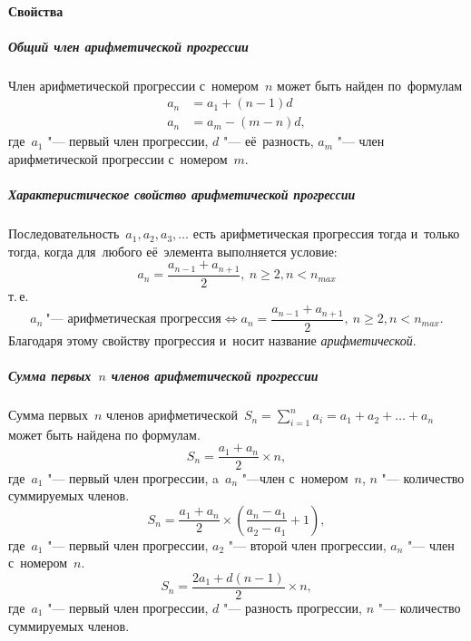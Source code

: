 \documentclass[]{scrartcl}
\begin{document}
{{\paragraph{Свойства}
\subparagraph{Общий член арифметической прогрессии}
Член арифметической прогрессии с~номером~${\textstyle n}$ может быть найден по~формулам
\begin{equation}\label{eq:arithmetic-progression-4}
	\begin{aligned}
	a_n&=a_1+(n-1)d\\
	a_n&=a_{m}-(m-n)d, 
	\end{aligned}
\end{equation}
где~${\textstyle a_{1}}$ "--- первый член прогрессии, ${\textstyle d}$ "--- её~разность, ${\textstyle a_{m}}$ "--- член арифметической прогрессии с~номером~${\textstyle m}$.

\subparagraph{Характеристическое свойство арифметической прогрессии}
Последовательность~${\textstyle a_{1},a_{2},a_{3},\ldots}$ есть арифметическая прогрессия тогда и~только тогда, когда для~любого её~элемента выполняется условие:
\begin{equation}\label{eq:arithmetic-progression-5}
a_{n}={\frac {a_{n-1}+a_{n+1}}{2}},\ n \geq 2, n < n_{max}
\end{equation}
т.\,е.
\begin{equation}\label{eq:arithmetic-progression-6}
a_n\ \text{"--- арифметическая прогрессия} \Leftrightarrow a_{n}={\frac {a_{n-1}+a_{n+1}}{2}},\ n \geq 2, n < n_{max}.
\end{equation}
Благодаря этому свойству прогрессия и~носит название \emph{арифметической}.
\subparagraph{Сумма первых~${\textstyle n}$ членов арифметической прогрессии}
Сумма первых~${\textstyle n}$ членов арифметической~${\displaystyle S_{n}=\sum _{i=1}^{n}a_{i}=a_{1}+a_{2}+\ldots +a_{n}}$ может быть найдена по формулам.
\begin{equation}\label{eq:arithmetic-progression-7}
S_n=\frac{a_1+a_n}{2} \times n, 
\end{equation} 
где~${\textstyle a_{1}}$ "--- первый член прогрессии, a~${\textstyle a_{n}}$ "---член с~номером~${\textstyle n}$, ${\textstyle n}$ "--- количество суммируемых членов.
\begin{equation}\label{eq:arithmetic-progression-8}
S_{n}=\frac{a_{1}+a_{n}}{2}\times ({\frac {a_{n}-a_{1}}{a_{2}-a_{1}}}+1),
\end{equation}
где~${\textstyle a_{1}}$ "--- первый член прогрессии, ${\textstyle a_{2}}$ "--- второй член прогрессии, ${\textstyle a_{n}}$ "--- член с~номером~${\textstyle n}$.
\begin{equation}\label{eq:arithmetic-progression-9}
S_n=\frac{2a_1+d(n-1)}{2} \times n,
\end{equation}
где~${\textstyle a_{1}}$ "--- первый член прогрессии, ${\textstyle d}$ "--- разность прогрессии, ${\textstyle n}$ "--- количество суммируемых членов.

}}
\end{document}
